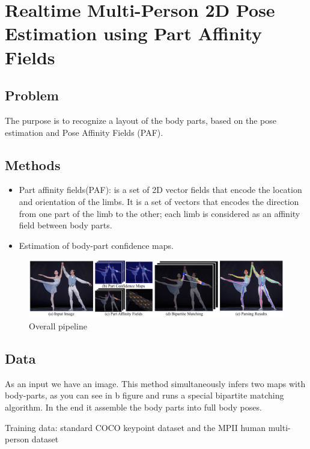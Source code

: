 \section{Realtime Multi-Person 2D Pose Estimation using Part Affinity Fields
\cite{DBLP:journals/corr/CaoSWS16}}

\subsection{Problem}
\par The purpose is to recognize a layout of the body parts, based on the pose estimation and Pose Affinity Fields (PAF).

\subsection{Methods}
 \begin{itemize}
    \item Part affinity fields(PAF): is a set of 2D vector fields that encode the location and orientation of the limbs. It is a set of vectors that encodes the direction from one part of the limb to the other; each limb is considered as an affinity field between body parts.
    \item Estimation of body-part confidence maps.
 \end{itemize}
\begin{figure}[htbp]
	\centerline{\includegraphics[scale=0.25]{fig/algoritm-ann.png}}  
	\caption{Overall pipeline \cite{DBLP:journals/corr/CaoSWS16}}
\end{figure}

\subsection{Data}
\par As an input we have an image. This method simultaneously infers two maps with body-parts, as you can see in b figure and runs a special bipartite matching algorithm. In the end it assemble the body parts into full body poses.
\par Training data: standard COCO keypoint dataset \cite{coco2016} and the MPII human multi-person
dataset \cite{database2dhuman}
